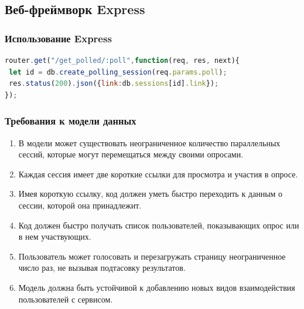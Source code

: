 \documentclass{beamer}
\begin{document}
\subsection{Веб-фреймворк Express}
\begin{frame}[fragile] %
\frametitle{Использование Express}

\begin{lstlisting}[language=JavaScript,columns=fullflexible]
router.get("/get_polled/:poll",function(req, res, next){
 let id = db.create_polling_session(req.params.poll);
 res.status(200).json({link:db.sessions[id].link});
});
\end{lstlisting}
\end{frame}

\begin{frame}
\frametitle{Требования к модели данных}
\begin{enumerate}
	\item В модели может существовать неограниченное количество параллельных сессий, которые могут перемещаться между своими опросами.
	\item Каждая сессия имеет две короткие ссылки для просмотра и участия в опросе. 
	\item Имея короткую ссылку, код должен уметь быстро переходить к данным о сессии, которой она принадлежит.
	\item Код должен быстро получать список пользователей, показывающих опрос или в нем участвующих.
	\item Пользователь может голосовать и перезагружать страницу неограниченное число раз, не вызывая подтасовку результатов.
	\item Модель должна быть устойчивой к добавлению новых видов взаимодействия пользователей с сервисом.
\end{enumerate}
\end{frame}

\end{document}

